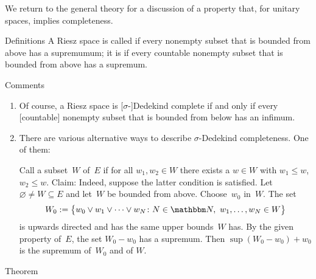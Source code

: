 \documentclass[main.tex]{subfiles}
\begin{document}
%
%
\noindent We return to the general theory
for a discussion of a property that,
for unitary spaces,
implies completeness.
\begin{psec}{4.16}{Definitions}
A Riesz space is called 
if every nonempty subset that is bounded from above
has a supremumum;
it is 
if every countable nonempty subset
that is bounded from above
has a supremum.
\end{psec}
%
%
\begin{psec}{4.17}{Comments}
\begin{enumerate}
\item \label{4.17-1}
Of course,
a Riesz space is [$\sigma$-]Dedekind complete
if and only if every [countable] nonempty subset
that is bounded from below has an infimum.
%
\item \label{4.17-2}
There are various alternative ways to describe
$\sigma$-Dedekind completeness.
One of them:

Call a subset~$W$ of~$E$ 
if for all $w_1,w_2\in W$
there exists a $w\in W$ with $w_1\leq w$, $w_2\leq w$.
Claim:
Indeed,
suppose the latter condition is satisfied.
Let $\varnothing\neq W\subseteq E$ 
and let~$W$ be bounded from above.
Choose~$w_0$ in~$W$.
The set
\begin{equation*}
W_0 :=\bigl\{w_0\vee w_1\vee \dotsb \vee w_N\colon
 N\in \N,\ w_1,\dotsc,w_N\in W\bigr\}
\end{equation*}
is upwards directed and has the same upper bounds~$W$ has.
By the given property of~$E$,
the set $W_0 - w_0$ has a supremum.
Then $\sup(W_0-w_0)+w_0$ is the supremum of~$W_0$ and of $W$.
\end{enumerate}
\end{psec}
%
%
\begin{psec}{4.18}{Theorem}  \end{psec}
\end{document}
